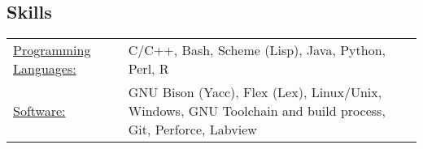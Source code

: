 \documentclass[margin]{res}
\begin{document}
\begin{resume}
\section{Skills}
   \begin{tabular}{l p{3in}}
	   \underline{Programming Languages:} & C/C++, Bash, Scheme (Lisp), Java, Python, Perl, R  \\

	   \underline{Software:} &  GNU Bison (Yacc), Flex (Lex), Linux/Unix, Windows, GNU Toolchain and build process,
	   		Git, Perforce, Labview \\
 \end{tabular}

\end{resume} 
\end{document}
